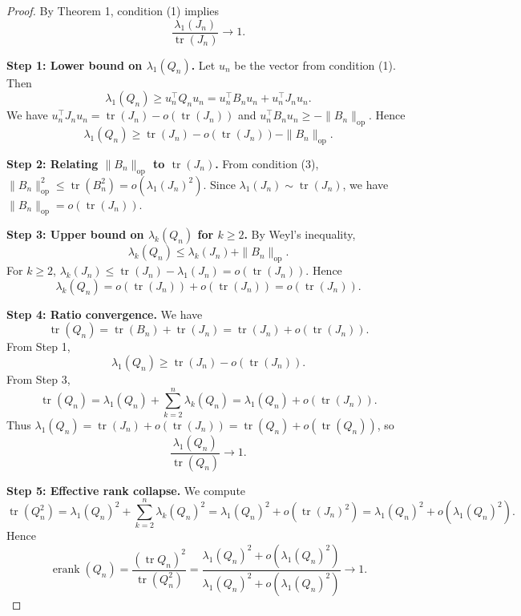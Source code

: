 \documentclass[10pt,a4paper]{amsart}
\begin{document}
\begin{proof}
By Theorem 1, condition (1) implies
\[
\frac{\lambda_1(J_n)}{\operatorname{tr}(J_n)} \to 1.
\]

\textbf{Step 1: Lower bound on \(\lambda_1(Q_n)\).}
Let \(u_n\) be the vector from condition (1). Then
\[
\lambda_1(Q_n) \ge u_n^\top Q_n u_n = u_n^\top B_n u_n + u_n^\top J_n u_n.
\]
We have \(u_n^\top J_n u_n = \operatorname{tr}(J_n) - o(\operatorname{tr}(J_n))\) and \(u_n^\top B_n u_n \ge -\|B_n\|_{\mathrm{op}}\). Hence
\[
\lambda_1(Q_n) \ge \operatorname{tr}(J_n) - o(\operatorname{tr}(J_n)) - \|B_n\|_{\mathrm{op}}.
\]

\textbf{Step 2: Relating \(\|B_n\|_{\mathrm{op}}\) to \(\operatorname{tr}(J_n)\).}
From condition (3), \(\|B_n\|_{\mathrm{op}}^2 \le \operatorname{tr}(B_n^2) = o(\lambda_1(J_n)^2)\). Since \(\lambda_1(J_n) \sim \operatorname{tr}(J_n)\), we have \(\|B_n\|_{\mathrm{op}} = o(\operatorname{tr}(J_n))\).

\textbf{Step 3: Upper bound on \(\lambda_k(Q_n)\) for \(k \ge 2\).}
By Weyl's inequality,
\[
\lambda_k(Q_n) \le \lambda_k(J_n) + \|B_n\|_{\mathrm{op}}.
\]
For \(k \ge 2\), \(\lambda_k(J_n) \le \operatorname{tr}(J_n) - \lambda_1(J_n) = o(\operatorname{tr}(J_n))\). Hence
\[
\lambda_k(Q_n) = o(\operatorname{tr}(J_n)) + o(\operatorname{tr}(J_n)) = o(\operatorname{tr}(J_n)).
\]

\textbf{Step 4: Ratio convergence.}
We have
\[
\operatorname{tr}(Q_n) = \operatorname{tr}(B_n) + \operatorname{tr}(J_n) = \operatorname{tr}(J_n) + o(\operatorname{tr}(J_n)).
\]
From Step 1,
\[
\lambda_1(Q_n) \ge \operatorname{tr}(J_n) - o(\operatorname{tr}(J_n)).
\]
From Step 3,
\[
\operatorname{tr}(Q_n) = \lambda_1(Q_n) + \sum_{k=2}^n \lambda_k(Q_n) = \lambda_1(Q_n) + o(\operatorname{tr}(J_n)).
\]
Thus \(\lambda_1(Q_n) = \operatorname{tr}(J_n) + o(\operatorname{tr}(J_n)) = \operatorname{tr}(Q_n) + o(\operatorname{tr}(Q_n))\), so
\[
\frac{\lambda_1(Q_n)}{\operatorname{tr}(Q_n)} \to 1.
\]

\textbf{Step 5: Effective rank collapse.}
We compute
\[
\operatorname{tr}(Q_n^2) = \lambda_1(Q_n)^2 + \sum_{k=2}^n \lambda_k(Q_n)^2 = \lambda_1(Q_n)^2 + o(\operatorname{tr}(J_n)^2) = \lambda_1(Q_n)^2 + o(\lambda_1(Q_n)^2).
\]
Hence
\[
\operatorname{erank}(Q_n) = \frac{(\operatorname{tr} Q_n)^2}{\operatorname{tr}(Q_n^2)} = \frac{\lambda_1(Q_n)^2 + o(\lambda_1(Q_n)^2)}{\lambda_1(Q_n)^2 + o(\lambda_1(Q_n)^2)} \to 1.
\]

\end{proof}
\end{document}

